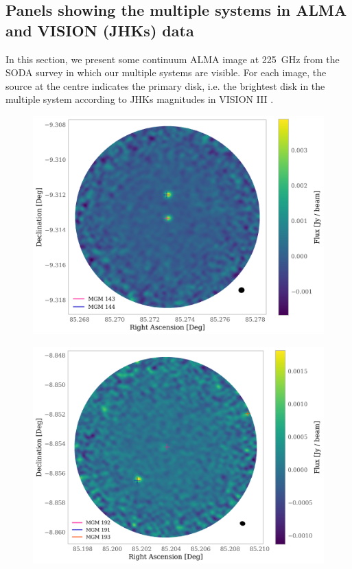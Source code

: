 \documentclass{aa}
\begin{document}
\begin{appendix}
\newpage
\FloatBarrier
\section{Panels showing the multiple systems in ALMA and VISION (JHKs) data} \label{appendixC}
In this section, we present some continuum ALMA image at 225~GHz from the SODA survey \citep{van_Terwisga_2022} in which our multiple systems are visible. For each image, the source at the centre indicates the primary disk, i.e. the brightest disk in the multiple system according to JHKs magnitudes in VISION III \citep{Grosschedl19}. 


\begin{figure} [hbt!]
\centering
   \includegraphics[width=\columnwidth]{MGM_143.png}
     \caption{}
\end{figure}

\vspace{-0.2cm}
\begin{figure} [hbt!]
\centering
   \includegraphics[width=\columnwidth]{MGM_192.png}
     \caption{}
\end{figure}


\end{appendix}
\end{document}
